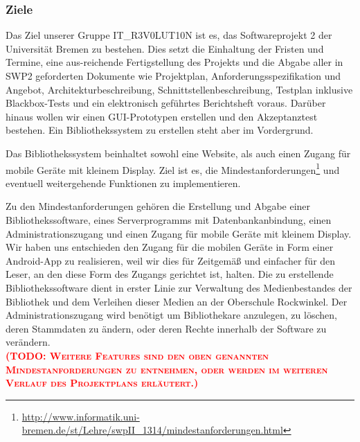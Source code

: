 \documentclass[fontsize=12pt,paper=a4,twoside]{scrartcl}
\newcommand{\todo}[1]{\textbf{\textsc{\textcolor{red}{(TODO: #1)}}}}
\begin{document}
\subsubsection{Ziele}
Das Ziel unserer Gruppe IT\_R3V0LUT10N ist es, das Softwareprojekt 2 der Universität Bremen zu bestehen. Dies setzt die Einhaltung der Fristen und Termine, eine aus-reichende Fertigstellung des Projekts und die Abgabe aller in SWP2 geforderten Dokumente wie Projektplan, Anforderungsspezifikation und Angebot, Architekturbeschreibung, Schnittstellenbeschreibung, Testplan inklusive Blackbox-Tests und ein elektronisch geführtes Berichtsheft voraus. Darüber hinaus wollen wir einen GUI-Prototypen erstellen und den Akzeptanztest bestehen. Ein Bibliothekssystem zu erstellen steht aber im Vordergrund.

Das Bibliothekssystem beinhaltet sowohl eine Website, als auch einen Zugang für mobile Geräte mit kleinem Display. Ziel ist es, die \label{sec:minreq}Mindestanforderungen\footnote{\url{http://www.informatik.uni-bremen.de/st/Lehre/swpII_1314/mindestanforderungen.html}} und eventuell weitergehende Funktionen zu implementieren.

Zu den Mindestanforderungen gehören die Erstellung und Abgabe einer Bibliothekssoftware, eines Serverprogramms mit Datenbankanbindung, einen Administrationszugang und einen Zugang für mobile Geräte mit kleinem Display. Wir haben uns entschieden den Zugang für die mobilen Geräte in Form einer Android-App zu realisieren, weil wir dies für Zeitgemäß und einfacher für den Leser, an den diese Form des Zugangs gerichtet ist, halten. Die zu erstellende Bibliothekssoftware dient in erster Linie zur Verwaltung des Medienbestandes der Bibliothek und dem Verleihen dieser Medien an der Oberschule Rockwinkel. Der Administrationszugang wird benötigt um Bibliothekare anzulegen, zu löschen, deren Stammdaten zu ändern, oder deren Rechte innerhalb der Software zu verändern.\\ \todo{Weitere Features sind den oben genannten Mindestanforderungen zu entnehmen, oder werden im weiteren Verlauf des Projektplans erläutert.}
\newpage
\end{document}
